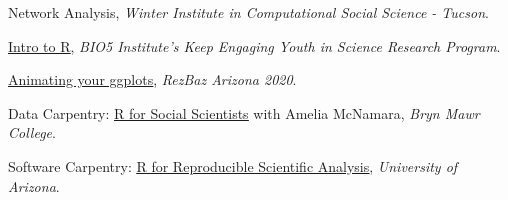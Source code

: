 Network Analysis, \emph{Winter Institute in Computational Social Science - Tucson}. 

\underline{\href{https://kelseygonzalez.github.io/portfolio/R_KEYS-Workshop/
}{Intro to R}}, \emph{BIO5 Institute's Keep Engaging Youth in Science Research Program}. 

\underline{\href{https://kelseygonzalez.github.io/portfolio/gganimate-lesson/}{Animating your ggplots}}, \emph{RezBaz Arizona 2020}. 

Data Carpentry: \underline{\href{https://kelseygonzalez.github.io/2020-01-15-brynmawr/}{R for Social Scientists}} with Amelia McNamara, \emph{Bryn Mawr College}. 

Software Carpentry: \underline{\href{https://ua-carpentries-workshops.github.io/2019-10-26-Tucson/}{R for Reproducible Scientific Analysis}}, \emph{University of Arizona}. 
